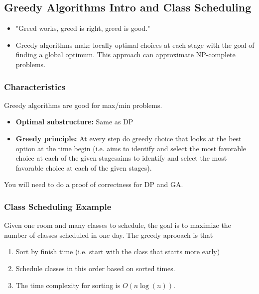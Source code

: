 \subsection{Greedy Algorithms Intro and Class Scheduling}

\begin{intuition}
    \begin{itemize}
        \item "Greed works, greed is right, greed is good." 
        \item Greedy algorithms make locally optimal choices at each stage with the goal of finding a global optimum. This approach can approximate NP-complete problems.
    \end{itemize}
\end{intuition}

\subsubsection{Characteristics}
\begin{definition}
        Greedy algorithms are good for max/min problems. 
        \begin{itemize}
            \item \textbf{Optimal substructure:} Same as DP
            \item \textbf{Greedy principle:} At every step do greedy choice that looks at the best option at the time begin (i.e. aims to identify and select the most favorable choice at each of the given stagesaims to identify and select the most favorable choice at each of the given stages). 
        \end{itemize}
\end{definition}

\begin{warning}
    You will need to do a proof of correctness for DP and GA.
\end{warning}

\subsubsection{Class Scheduling Example}
\begin{example}
    Given one room and many classes to schedule, the goal is to maximize the number of classes scheduled in one day. The greedy aprooach is that
    \begin{enumerate}
        \item Sort by finish time (i.e. start with the class that starts more early)
        \item Schedule classes in this order based on sorted times.
        \item The time complexity for sorting is $O(n\log(n))$.
    \end{enumerate}

\end{example}

